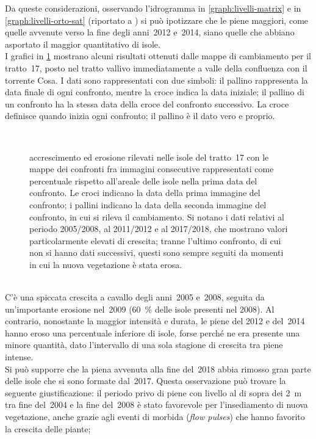 Da queste considerazioni, osservando l'idrogramma in \cref{graph:livelli-matrix} e in \cref{graph:livelli-orto-sat} (riportato a ) si può ipotizzare che le piene maggiori, come quelle avvenute verso la fine degli anni~2012 e~2014, siano quelle che abbiano asportato il maggior quantitativo di isole.
\\
I grafici in \cref{graph:tr-17-camb} mostrano alcuni risultati ottenuti dalle mappe di cambiamento per il tratto~17, posto nel tratto vallivo immediatamente a valle della confluenza con il torrente Cosa.
I dati sono rappresentati con due simboli: il pallino rappresenta la data finale di ogni confronto, mentre la croce indica la data iniziale; il pallino di un confronto ha la stessa data della croce del confronto successivo. 
La croce definisce quando inizia ogni confronto; il pallino è il dato vero e proprio.
%
\begin{figure}
	\centering
	
	\\
	
	\caption[cambiamenti rilevati nelle isole nel tratto~17]{accrescimento ed erosione rilevati nelle isole del tratto~17 con le mappe dei confronti fra immagini consecutive rappresentati come percentuale rispetto all'areale delle isole nella prima data del confronto.
	Le croci indicano la data della prima immagine del confronto; i pallini indicano la data della seconda immagine del confronto, in cui si rileva il cambiamento.
	Si notano i dati relativi al periodo 2005/2008, al 2011/2012 e al 2017/2018, che mostrano valori particolarmente elevati di crescita; tranne l'ultimo confronto, di cui non si hanno dati successivi, questi sono sempre seguiti da momenti in cui la nuova vegetazione è stata erosa.}
	\label{graph:tr-17-camb}
\end{figure}
%
\\
C'è una spiccata crescita a cavallo degli anni~2005 e~2008, seguita da un'importante erosione nel~2009 (\SI{60}{\percent} delle isole presenti nel 2008).
Al contrario, nonostante la maggior intensità e durata, le piene del 2012 e del~2014 hanno eroso una percentuale inferiore di isole, forse perché ne era presente una minore quantità, dato l'intervallo di una sola stagione di crescita tra piene intense.
\\
Si può supporre che la piena avvenuta alla fine del~2018 abbia rimosso gran parte delle isole che si sono formate dal~2017.
Questa osservazione può trovare la seguente giustificazione: il periodo privo di piene con livello al di sopra dei \SI{2}{\m} tra fine del~2004 e la fine del~2008 è stato favorevole per l'insediamento di nuova vegetazione, anche grazie agli eventi di morbida (\emph{flow pulses}) che hanno favorito la crescita delle piante;
